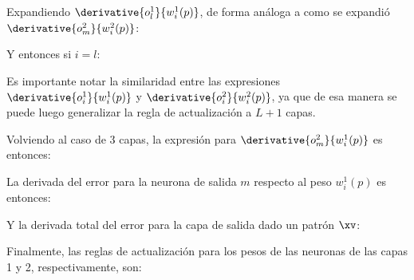 Expandiendo $\derivative{o_l^1 }{w_i^1(p)}$, de forma análoga a como se expandió $\derivative{o_m^2 }{w_i^2(p)}$:

Y entonces si $i=l$:


Es importante notar la similaridad entre las expresiones $\derivative{o_i^1}{w_i^1(p)}$ y $\derivative{o_i^2}{w_i^2(p)}$, ya que de esa manera se puede luego generalizar la regla de actualización a $L+1$ capas.

Volviendo al caso de $3$ capas, la expresión para $
\derivative{o_m^2}{w_i^1(p)}$ es entonces:


La derivada del error para la neurona de salida $m$ respecto al peso $w_i^1(p)$ es entonces:



Y la derivada total del error para la capa de salida dado un patrón $\xv$:


Finalmente, las reglas de actualización para los pesos de las neuronas de las capas 1 y 2, respectivamente, son:


